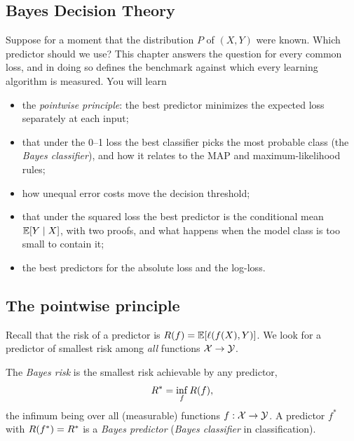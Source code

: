 \begin{notechapter}
\chapter{Bayes Decision Theory}\label{ch:bayes-decision-theory}

\begin{chapterintro}
Suppose for a moment that the distribution $P$ of $(X,Y)$ were known. Which
predictor should we use? This chapter answers the question for every common
loss, and in doing so defines the benchmark against which every learning
algorithm is measured. You will learn
\begin{itemize}[nosep]
  \item the \emph{pointwise principle}: the best predictor minimizes the
        expected loss separately at each input;
  \item that under the 0--1 loss the best classifier picks the most probable
        class (the \emph{Bayes classifier}), and how it relates to the MAP and
        maximum-likelihood rules;
  \item how unequal error costs move the decision threshold;
  \item that under the squared loss the best predictor is the conditional
        mean $\mathbb{E}[Y \mid X]$, with two proofs, and what happens when the model
        class is too small to contain it;
  \item the best predictors for the absolute loss and the log-loss.
\end{itemize}
\end{chapterintro}

\section{The pointwise principle}\label{bayes-decision-theory:sec:pointwise}

Recall that the risk of a predictor is $R(f) = \mathbb{E}[\ell(f(X),Y)]$. We look
for a predictor of smallest risk among \emph{all} functions $\mathcal{X} \to \mathcal{Y}$.

\begin{definition}
The \emph{Bayes risk} is the smallest risk achievable by any predictor,
\[
  R^* = \inf_{f} R(f),
\]
the infimum being over all (measurable) functions $f:\mathcal{X}\to\mathcal{Y}$. A predictor
$f^*$ with $R(f^*) = R^*$ is a \emph{Bayes predictor} (\emph{Bayes
classifier} in classification).
\end{definition}


\end{notechapter}
